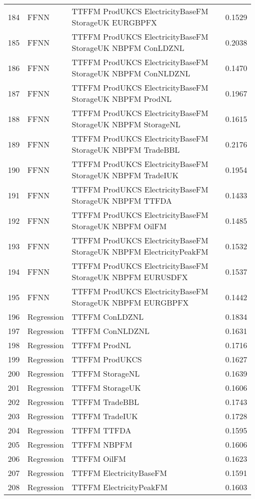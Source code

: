 \begin{table}[ht]
\begin{tabular}{rllr}
  184 & FFNN & TTFFM ProdUKCS ElectricityBaseFM StorageUK EURGBPFX & 0.1529 \\ 
  185 & FFNN & TTFFM ProdUKCS ElectricityBaseFM StorageUK NBPFM ConLDZNL & 0.2038 \\ 
  186 & FFNN & TTFFM ProdUKCS ElectricityBaseFM StorageUK NBPFM ConNLDZNL & 0.1470 \\ 
  187 & FFNN & TTFFM ProdUKCS ElectricityBaseFM StorageUK NBPFM ProdNL & 0.1967 \\ 
  188 & FFNN & TTFFM ProdUKCS ElectricityBaseFM StorageUK NBPFM StorageNL & 0.1615 \\ 
  189 & FFNN & TTFFM ProdUKCS ElectricityBaseFM StorageUK NBPFM TradeBBL & 0.2176 \\ 
  190 & FFNN & TTFFM ProdUKCS ElectricityBaseFM StorageUK NBPFM TradeIUK & 0.1954 \\ 
  191 & FFNN & TTFFM ProdUKCS ElectricityBaseFM StorageUK NBPFM TTFDA & 0.1433 \\ 
  192 & FFNN & TTFFM ProdUKCS ElectricityBaseFM StorageUK NBPFM OilFM & 0.1485 \\ 
  193 & FFNN & TTFFM ProdUKCS ElectricityBaseFM StorageUK NBPFM ElectricityPeakFM & 0.1532 \\ 
  194 & FFNN & TTFFM ProdUKCS ElectricityBaseFM StorageUK NBPFM EURUSDFX & 0.1537 \\ 
  195 & FFNN & TTFFM ProdUKCS ElectricityBaseFM StorageUK NBPFM EURGBPFX & 0.1442 \\ 
  196 & Regression & TTFFM ConLDZNL & 0.1834 \\ 
  197 & Regression & TTFFM ConNLDZNL & 0.1631 \\ 
  198 & Regression & TTFFM ProdNL & 0.1716 \\ 
  199 & Regression & TTFFM ProdUKCS & 0.1627 \\ 
  200 & Regression & TTFFM StorageNL & 0.1639 \\ 
  201 & Regression & TTFFM StorageUK & 0.1606 \\ 
  202 & Regression & TTFFM TradeBBL & 0.1743 \\ 
  203 & Regression & TTFFM TradeIUK & 0.1728 \\ 
  204 & Regression & TTFFM TTFDA & 0.1595 \\ 
  205 & Regression & TTFFM NBPFM & 0.1606 \\ 
  206 & Regression & TTFFM OilFM & 0.1623 \\ 
  207 & Regression & TTFFM ElectricityBaseFM & 0.1591 \\ 
  208 & Regression & TTFFM ElectricityPeakFM & 0.1603 \\ 

\end{tabular}
\end{table}
